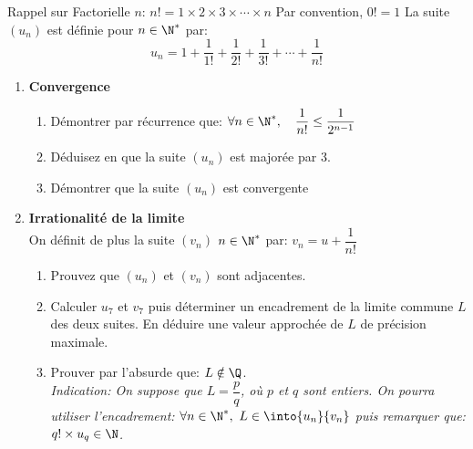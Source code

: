 \begin{exercice}

 Rappel sur \og Factorielle $n$\fg{}:
$n!=1\times2\times3\times\cdots\times n$ Par convention, $0!=1$
La suite $(u_n)$ est d\'efinie pour $n\in\N^*$ par:
\[ u_n=1+\frac{1}{1!}+\frac{1}{2!}+\frac{1}{3!}+\cdots+\frac{1}{n!}\]
  \begin{enumerate}
  \item {\bf Convergence}
\begin{enumerate}
  \item D\'emontrer par r\'ecurrence que: $\forall n\in\N^*,\quad    \dfrac{1}{n!}\leq \dfrac{1}{2^{n-1}}$

\item D\'eduisez en que la suite $(u_n)$ est major\'ee par 3.
\item D\'emontrer que la suite $(u_n)$ est convergente
  \end{enumerate}
\item {\bf Irrationalit\'e de la limite}\\
On d\'efinit de plus la suite $(v_n)$ $n\in\N^*$ par: $v_n=u+\dfrac{1}{n!}$
\begin{enumerate}
\item Prouvez que $(u_n)$ et $(v_n)$ sont adjacentes.
\item Calculer $u_7$ et $v_7$ puis d\'eterminer un encadrement de la
  limite commune $L$ des deux suites. En d\'eduire une valeur approch\'ee
  de $L$ de pr\'ecision maximale.
\item Prouver par l'absurde que: $L\notin \Q$. \\
\emph{Indication: On suppose que $L=\dfrac{p}{q}$, o\`u $p$ et $q$
  sont entiers. On pourra
    utiliser l'encadrement: $\forall n\in\N^*,\ L
    \in\into{u_n}{v_n}$ puis remarquer que: $q!\times u_q\in\N$.}
\end{enumerate}

\end{enumerate}
\end{exercice}
